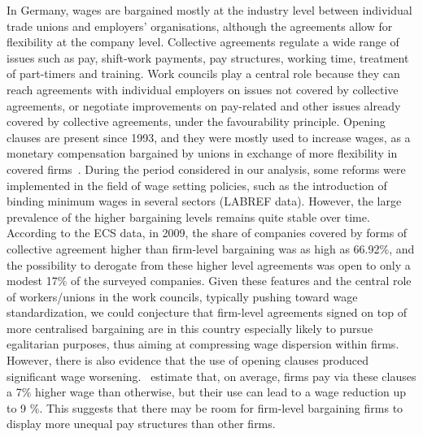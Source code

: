 \documentclass[12pt]{article}
\begin{document}
In Germany, wages are bargained mostly at the industry level between
individual trade unions and employers' organisations, although the
agreements allow for flexibility at the company level. Collective
agreements regulate a wide range of issues such as pay, shift-work
payments, pay structures, working time, treatment of part-timers and
training. Work councils play a central role because they can reach
agreements with individual employers on issues not covered by
collective agreements, or negotiate improvements on pay-related and
other issues already covered by collective agreements, under the
favourability principle. Opening clauses are present since 1993, and
they were mostly used to increase wages, as a monetary compensation
bargained by unions in exchange of more flexibility in covered
firms~\citep{brandle2013opening}. During the period considered in our
analysis, some reforms were implemented in the field of wage setting
policies, such as the introduction of binding minimum wages in several
sectors (LABREF data). However, the large prevalence of the higher
bargaining levels remains quite stable over time. According to the ECS
data, in 2009, the share of companies covered by forms of collective
agreement higher than firm-level bargaining was as high as 66.92\%,
and the possibility to derogate from these higher level agreements was
open to only a modest 17\% of the surveyed companies. Given these
features and the central role of workers/unions in the work councils,
typically pushing toward wage standardization, we could conjecture
that firm-level agreements signed on top of more centralised
bargaining are in this country especially likely to pursue egalitarian
purposes, thus aiming at compressing wage dispersion within firms.
However, there is also evidence that the use of opening clauses
produced significant wage worsening.~\cite{ellguth2012wage} estimate
that, on average, firms pay via these clauses a 7\% higher wage than
otherwise, but their use can lead to a wage reduction up to 9 \%. This
suggests that there may be room for firm-level bargaining firms to
display more unequal pay structures than other firms.
\end{document}
